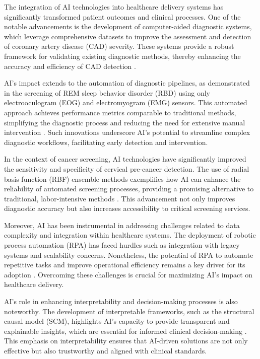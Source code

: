 The integration of AI technologies into healthcare delivery systems has significantly transformed patient outcomes and clinical processes. One of the notable advancements is the development of computer-aided diagnostic systems, which leverage comprehensive datasets to improve the assessment and detection of coronary artery disease (CAD) severity. These systems provide a robust framework for validating existing diagnostic methods, thereby enhancing the accuracy and efficiency of CAD detection \cite{jimnezpartinen2024cadicanewdatasetcoronary}.



AI's impact extends to the automation of diagnostic pipelines, as demonstrated in the screening of REM sleep behavior disorder (RBD) using only electrooculogram (EOG) and electromyogram (EMG) sensors. This automated approach achieves performance metrics comparable to traditional methods, simplifying the diagnostic process and reducing the need for extensive manual intervention \cite{cooray2019screeningremsleepbehaviour}. Such innovations underscore AI's potential to streamline complex diagnostic workflows, facilitating early detection and intervention.



In the context of cancer screening, AI technologies have significantly improved the sensitivity and specificity of cervical pre-cancer detection. The use of radial basis function (RBF) ensemble methods exemplifies how AI can enhance the reliability of automated screening processes, providing a promising alternative to traditional, labor-intensive methods \cite{tumer1999ensemblesradialbasisfunction}. This advancement not only improves diagnostic accuracy but also increases accessibility to critical screening services.



Moreover, AI has been instrumental in addressing challenges related to data complexity and integration within healthcare systems. The deployment of robotic process automation (RPA) has faced hurdles such as integration with legacy systems and scalability concerns. Nonetheless, the potential of RPA to automate repetitive tasks and improve operational efficiency remains a key driver for its adoption \cite{pandy2024advancementsroboticsprocessautomation}. Overcoming these challenges is crucial for maximizing AI's impact on healthcare delivery.



AI's role in enhancing interpretability and decision-making processes is also noteworthy. The development of interpretable frameworks, such as the structural causal model (SCM), highlights AI's capacity to provide transparent and explainable insights, which are essential for informed clinical decision-making \cite{lin2023interpretabilityframeworksimilarcase}. This emphasis on interpretability ensures that AI-driven solutions are not only effective but also trustworthy and aligned with clinical standards.



